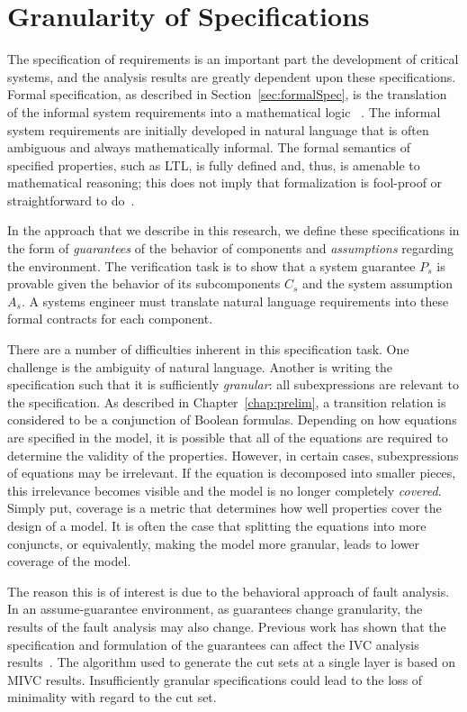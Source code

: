 \chapter{Granularity of Specifications}
\label{chap:granularity}
The specification of requirements is an important part the development of critical systems, and the analysis results are greatly dependent upon these specifications. Formal specification, as described in Section~\ref{sec:formalSpec}, is the translation of the informal system requirements into a mathematical logic ~\cite{hinchey2012industrial}. The informal system requirements are initially developed in natural language that is often ambiguous and always mathematically informal. The formal semantics of specified properties, such as LTL, is fully defined and, thus, is amenable to mathematical reasoning; this does not imply that formalization is fool-proof or straightforward to do~\cite{kotonya1998requirements}. 

 In the approach that we describe in this research, we define these specifications in the form of \emph{guarantees} of the behavior of components and \emph{assumptions} regarding the environment. The verification task is to show that a system guarantee $P_s$ is provable given the behavior of its subcomponents $C_s$ and the system assumption $A_s$. A systems engineer must translate natural language requirements into these formal contracts for each component. 
 
There are a number of difficulties inherent in this specification task. One challenge is the ambiguity of natural language. Another is writing the specification such that it is sufficiently {\em granular}: all subexpressions are relevant to the specification. As described in Chapter~\ref{chap:prelim}, a transition relation is considered to be a conjunction of Boolean formulas. Depending on how equations are specified in the model, it is possible that all of the equations are required to determine the validity of the properties. However, in certain cases, subexpressions of equations may be irrelevant. If the equation is decomposed into smaller pieces, this irrelevance becomes visible and the model is no longer completely {\em covered}. Simply put, coverage is a metric that determines how well properties cover the design of a model. It is often the case that splitting the equations into more conjuncts, or equivalently, making the model more granular, leads to lower coverage of the model. 
 
The reason this is of interest is due to the behavioral approach of fault analysis. In an assume-guarantee environment, as guarantees change granularity, the results of the fault analysis may also change. Previous work has shown that the specification and formulation of the guarantees can affect the IVC analysis results~\cite{ghassabani_2018}. The algorithm used to generate the cut sets at a single layer is based on MIVC results. Insufficiently granular specifications could lead to the loss of minimality with regard to the cut set. 

